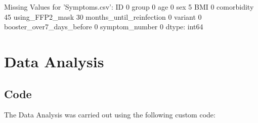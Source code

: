 \documentclass[11pt]{article}
\begin{document}
\begin{codeoutput}
Missing Values for 'Symptoms.csv':
ID                            0
group                         0
age                           0
sex                           5
BMI                           0
comorbidity                  45
using\_FFP2\_mask              30
months\_until\_reinfection      0
variant                       0
booster\_over7\_days\_before     0
symptom\_number                0
dtype: int64
\end{codeoutput}

\section{Data Analysis}
\subsection{{Code}}
The Data Analysis was carried out using the following custom code:
\end{document}
